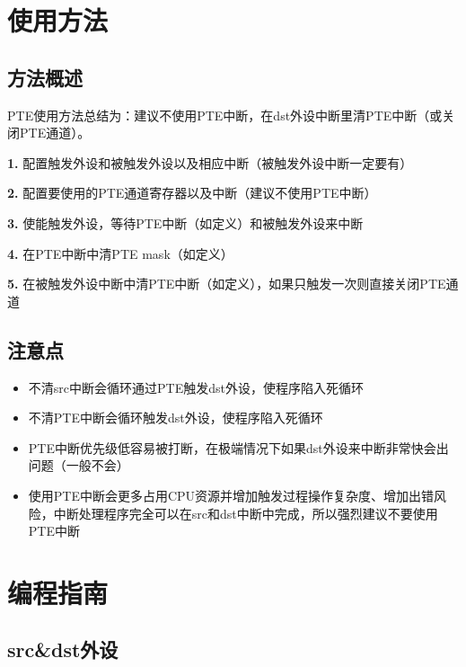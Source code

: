 \documentclass[
  12pt,
]{book}
\begin{document}
\hypertarget{ux4f7fux7528ux65b9ux6cd5-1}{%
\section{使用方法}\label{ux4f7fux7528ux65b9ux6cd5-1}}

\hypertarget{ux65b9ux6cd5ux6982ux8ff0-1}{%
\subsection{方法概述}\label{ux65b9ux6cd5ux6982ux8ff0-1}}

PTE使用方法总结为：建议不使用PTE中断，在dst外设中断里清PTE中断（或关闭PTE通道）。

\textbf{1.} 配置触发外设和被触发外设以及相应中断（被触发外设中断一定要有）

\textbf{2.} 配置要使用的PTE通道寄存器以及中断（建议不使用PTE中断）

\textbf{3.} 使能触发外设，等待PTE中断（如定义）和被触发外设来中断

\textbf{4.} 在PTE中断中清PTE mask（如定义）

\textbf{5.} 在被触发外设中断中清PTE中断（如定义），如果只触发一次则直接关闭PTE通道

\hypertarget{ux6ce8ux610fux70b9-1}{%
\subsection{注意点}\label{ux6ce8ux610fux70b9-1}}

\begin{itemize}
\item
  不清src中断会循环通过PTE触发dst外设，使程序陷入死循环
\item
  不清PTE中断会循环触发dst外设，使程序陷入死循环
\item
  PTE中断优先级低容易被打断，在极端情况下如果dst外设来中断非常快会出问题（一般不会）
\item
  使用PTE中断会更多占用CPU资源并增加触发过程操作复杂度、增加出错风险，中断处理程序完全可以在src和dst中断中完成，所以强烈建议不要使用PTE中断
\end{itemize}

\hypertarget{ux7f16ux7a0bux6307ux5357-1}{%
\section{编程指南}\label{ux7f16ux7a0bux6307ux5357-1}}

\hypertarget{srcdstux5916ux8bbe}{%
\subsection{src\&dst外设}\label{srcdstux5916ux8bbe}}
\end{document}
